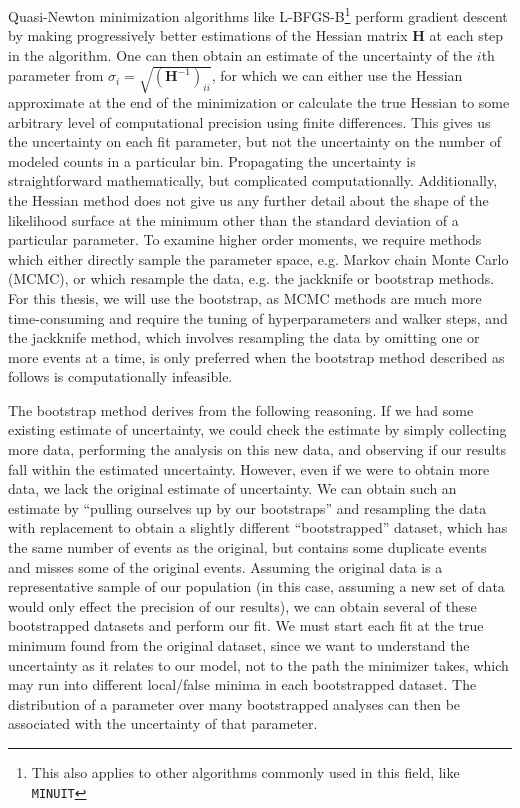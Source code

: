 Quasi-Newton minimization algorithms like L-BFGS-B\footnote{This also applies to other algorithms commonly used in this field, like \verb|MINUIT|} perform gradient descent by making progressively better estimations of the Hessian matrix $\mathbf{H}$ at each step in the algorithm. One can then obtain an estimate of the uncertainty of the $i$th parameter from $\sigma_i = \sqrt{(\mathbf{H}^{-1})_{ii}}$, for which we can either use the Hessian approximate at the end of the minimization or calculate the true Hessian to some arbitrary level of computational precision using finite differences. This gives us the uncertainty on each fit parameter, but not the uncertainty on the number of modeled counts in a particular bin. Propagating the uncertainty is straightforward mathematically, but complicated computationally. Additionally, the Hessian method does not give us any further detail about the shape of the likelihood surface at the minimum other than the standard deviation of a particular parameter. To examine higher order moments, we require methods which either directly sample the parameter space, e.g. Markov chain Monte Carlo (MCMC), or which resample the data, e.g. the jackknife or bootstrap methods. For this thesis, we will use the bootstrap, as MCMC methods are much more time-consuming and require the tuning of hyperparameters and walker steps, and the jackknife method, which involves resampling the data by omitting one or more events at a time, is only preferred when the bootstrap method described as follows is computationally infeasible.

The bootstrap method derives from the following reasoning. If we had some existing estimate of uncertainty, we could check the estimate by simply collecting more data, performing the analysis on this new data, and observing if our results fall within the estimated uncertainty. However, even if we were to obtain more data, we lack the original estimate of uncertainty. We can obtain such an estimate by ``pulling ourselves up by our bootstraps'' and resampling the data with replacement to obtain a slightly different ``bootstrapped'' dataset, which has the same number of events as the original, but contains some duplicate events and misses some of the original events. Assuming the original data is a representative sample of our population (in this case, assuming a new set of data would only effect the precision of our results), we can obtain several of these bootstrapped datasets and perform our fit. We must start each fit at the true minimum found from the original dataset, since we want to understand the uncertainty as it relates to our model, not to the path the minimizer takes, which may run into different local/false minima in each bootstrapped dataset. The distribution of a parameter over many bootstrapped analyses can then be associated with the uncertainty of that parameter.

